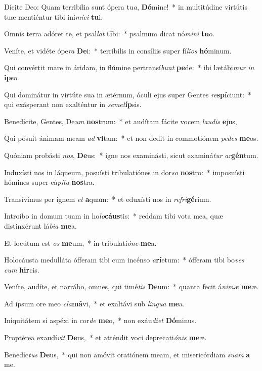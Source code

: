 \item Dícite Deo: Quam terribília sunt ópera tu\textit{a}, \textbf{Dó}mine!~* in multitúdine virtútis tuæ mentiéntur tibi ini\textit{mí}\textit{ci} \textbf{tu}i.
\item Omnis terra adóret te, et psal\textit{lat} \textbf{ti}bi:~* psalmum dicat nó\textit{mi}\textit{ni} \textbf{tu}o.
\item Veníte, et vidéte ópe\textit{ra} \textbf{De}i:~* terríbilis in consíliis super fí\textit{li}\textit{os} \textbf{hó}minum.
\item Qui convértit mare in áridam, in flúmine pertransí\textit{bunt} \textbf{pe}de:~* ibi lætábi\textit{mur} \textit{in} \textbf{ip}so.
\item Qui dominátur in virtúte sua in ætérnum, óculi ejus super Gentes \textit{re}\textbf{spí}ciunt:~* qui exásperant non exalténtur in \textit{se}\textit{met}\textbf{íp}sis.
\item Benedícite, Gentes, De\textit{um} \textbf{nos}trum:~* et audítam fácite vocem \textit{lau}\textit{dis} \textbf{e}jus,
\item Qui pósuit ánimam meam \textit{ad} \textbf{vi}tam:~* et non dedit in commotiónem \textit{pe}\textit{des} \textbf{me}os.
\item Quóniam probásti \textit{nos}, \textbf{De}us:~* igne nos examinásti, sicut examiná\textit{tur} \textit{ar}\textbf{gén}tum.
\item Induxísti nos in láqueum, posuísti tribulatiónes in dor\textit{so} \textbf{nos}tro:~* imposuísti hómines super cá\textit{pi}\textit{ta} \textbf{nos}tra.
\item Transívimus per ignem \textit{et} \textbf{a}quam:~* et eduxísti nos in \textit{re}\textit{fri}\textbf{gé}rium.
\item Introíbo in domum tuam in ho\textit{lo}\textbf{cáus}tis:~* reddam tibi vota mea, quæ distinxérunt lá\textit{bi}\textit{a} \textbf{me}a.
\item Et locútum est \textit{os} \textbf{me}um,~* in tribulati\textit{ó}\textit{ne} \textbf{me}a.
\item Holocáusta medulláta ófferam tibi cum incénso \textit{a}\textbf{rí}etum:~* ófferam tibi bo\textit{ves} \textit{cum} \textbf{hir}cis.
\item Veníte, audíte, et narrábo, omnes, qui timé\textit{tis} \textbf{De}um:~* quanta fecit á\textit{ni}\textit{mæ} \textbf{me}æ.
\item Ad ipsum ore meo \textit{cla}\textbf{má}vi,~* et exaltávi sub \textit{lin}\textit{gua} \textbf{me}a.
\item Iniquitátem si aspéxi in cor\textit{de} \textbf{me}o,~* non exáu\textit{di}\textit{et} \textbf{Dó}minus.
\item Proptérea exaudí\textit{vit} \textbf{De}us,~* et atténdit voci deprecati\textit{ó}\textit{nis} \textbf{me}æ.
\item Benedíc\textit{tus} \textbf{De}us,~* qui non amóvit oratiónem meam, et misericórdiam \textit{su}\textit{am} \textbf{a} me.
